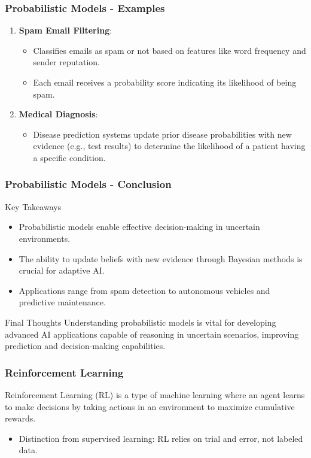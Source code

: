\documentclass[aspectratio=169]{beamer}
\begin{document}
\begin{frame}[fragile]
    \frametitle{Probabilistic Models - Examples}
    \begin{enumerate}
        \item \textbf{Spam Email Filtering}:
        \begin{itemize}
            \item Classifies emails as spam or not based on features like word frequency and sender reputation.
            \item Each email receives a probability score indicating its likelihood of being spam.
        \end{itemize}
        
        \item \textbf{Medical Diagnosis}:
        \begin{itemize}
            \item Disease prediction systems update prior disease probabilities with new evidence (e.g., test results) to determine the likelihood of a patient having a specific condition.
        \end{itemize}
    \end{enumerate}
\end{frame}

\begin{frame}[fragile]
    \frametitle{Probabilistic Models - Conclusion}
    \begin{block}{Key Takeaways}
        \begin{itemize}
            \item Probabilistic models enable effective decision-making in uncertain environments.
            \item The ability to update beliefs with new evidence through Bayesian methods is crucial for adaptive AI.
            \item Applications range from spam detection to autonomous vehicles and predictive maintenance.
        \end{itemize}
    \end{block}
    
    \begin{block}{Final Thoughts}
        Understanding probabilistic models is vital for developing advanced AI applications capable of reasoning in uncertain scenarios, improving prediction and decision-making capabilities.
    \end{block}
\end{frame}

\begin{frame}[fragile]
    \frametitle{Reinforcement Learning}
    Reinforcement Learning (RL) is a type of machine learning where an agent learns to make decisions by taking actions in an environment to maximize cumulative rewards.
    \begin{itemize}
        \item Distinction from supervised learning: RL relies on trial and error, not labeled data.
    \end{itemize}
\end{frame}
\end{document}
